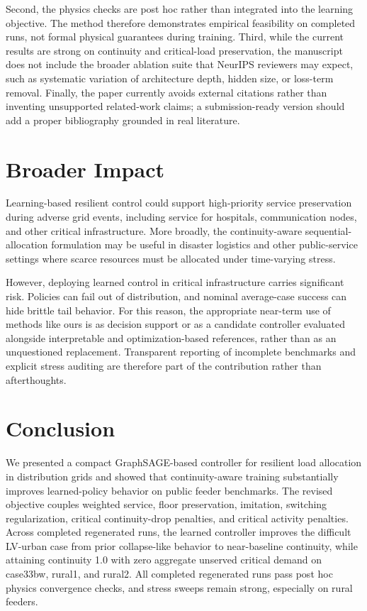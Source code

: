 \documentclass[11pt]{article}
\begin{document}
Second, the physics checks are post hoc rather than integrated into the learning objective. The method therefore demonstrates empirical feasibility on completed runs, not formal physical guarantees during training. Third, while the current results are strong on continuity and critical-load preservation, the manuscript does not include the broader ablation suite that NeurIPS reviewers may expect, such as systematic variation of architecture depth, hidden size, or loss-term removal. Finally, the paper currently avoids external citations rather than inventing unsupported related-work claims; a submission-ready version should add a proper bibliography grounded in real literature.

\section{Broader Impact}

Learning-based resilient control could support high-priority service preservation during adverse grid events, including service for hospitals, communication nodes, and other critical infrastructure. More broadly, the continuity-aware sequential-allocation formulation may be useful in disaster logistics and other public-service settings where scarce resources must be allocated under time-varying stress.

However, deploying learned control in critical infrastructure carries significant risk. Policies can fail out of distribution, and nominal average-case success can hide brittle tail behavior. For this reason, the appropriate near-term use of methods like ours is as decision support or as a candidate controller evaluated alongside interpretable and optimization-based references, rather than as an unquestioned replacement. Transparent reporting of incomplete benchmarks and explicit stress auditing are therefore part of the contribution rather than afterthoughts.

\section{Conclusion}

We presented a compact GraphSAGE-based controller for resilient load allocation in distribution grids and showed that continuity-aware training substantially improves learned-policy behavior on public feeder benchmarks. The revised objective couples weighted service, floor preservation, imitation, switching regularization, critical continuity-drop penalties, and critical activity penalties. Across completed regenerated runs, the learned controller improves the difficult LV-urban case from prior collapse-like behavior to near-baseline continuity, while attaining continuity 1.0 with zero aggregate unserved critical demand on case33bw, rural1, and rural2. All completed regenerated runs pass post hoc physics convergence checks, and stress sweeps remain strong, especially on rural feeders.
\end{document}
